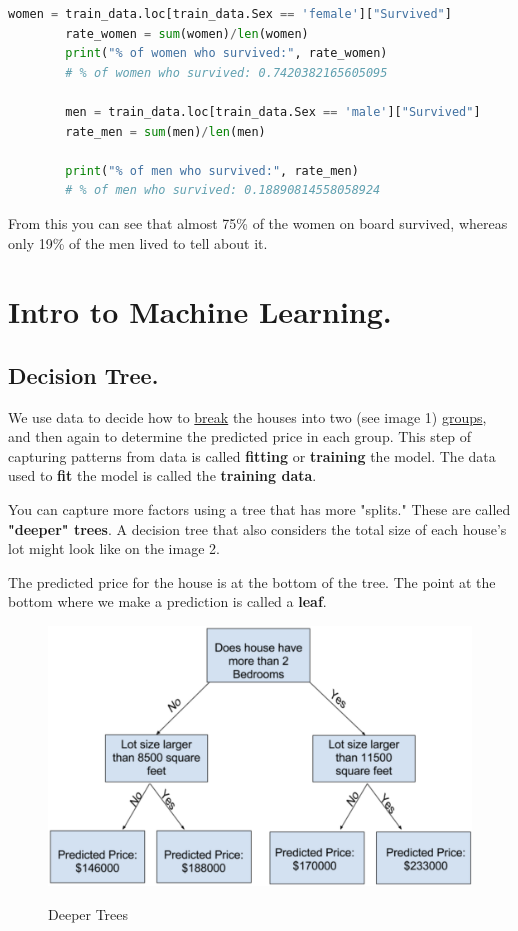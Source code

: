 \documentclass[11pt]{article}
\begin{document}
    \begin{lstlisting}[style=light, language=Python,label={lst:vectorimg},caption=Testing first assumption]
        women = train_data.loc[train_data.Sex == 'female']["Survived"]
        rate_women = sum(women)/len(women)
        print("% of women who survived:", rate_women)
        # % of women who survived: 0.7420382165605095

        men = train_data.loc[train_data.Sex == 'male']["Survived"]
        rate_men = sum(men)/len(men)

        print("% of men who survived:", rate_men)
        # % of men who survived: 0.18890814558058924
    \end{lstlisting}

    From this you can see that almost 75\% of the women on board survived, whereas only 19\% of the men lived to tell about it.


    \section{Intro to Machine Learning.}\label{sec:intro_to_ml}

    \subsection{Decision Tree.}\label{subsec:decision_tree}
    We use data to decide how to \underline{break} the houses into two (see image 1) \underline{groups}, and then again to determine the predicted price in each group.
    This step of capturing patterns from data is called \textbf{fitting} or \textbf{training} the model.
    The data used to \textbf{fit} the model is called the \textbf{training data}.

    You can capture more factors using a tree that has more "splits." These are called \textbf{"deeper" trees}.
    A decision tree that also considers the total size of each house's lot might look like on the image 2.

    The predicted price for the house is at the bottom of the tree.
    The point at the bottom where we make a prediction is called a \textbf{leaf}.

    \begin{figure}
        \label{fig:image2}
        \centering
        \includegraphics[scale=0.5]{image2.png}

        Deeper Trees
    \end{figure}
\end{document}
